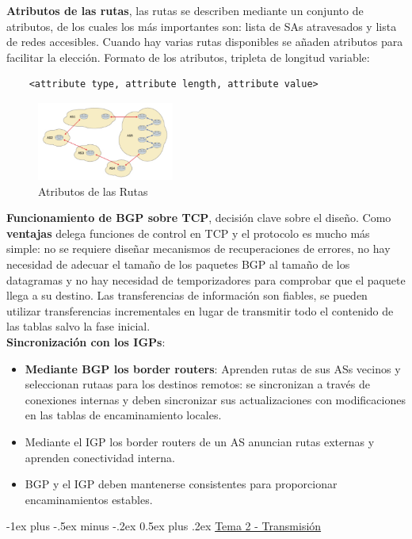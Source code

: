 \documentclass[10pt,portrait, twocolumn]{article}
\makeatletter
\renewcommand{\section}{\@startsection{section}{1}{0mm}%
                                {-1ex plus -.5ex minus -.2ex}%
                                {0.5ex plus .2ex}%
                                {\normalfont\large\bfseries}}
\makeatother
\begin{document}
\textbf{Atributos de las rutas}, las rutas se describen mediante un conjunto de atributos, de los cuales los más importantes son: lista de SAs atravesados y lista de redes accesibles. Cuando hay varias rutas disponibles se añaden atributos para facilitar la elección. Formato de los atributos, tripleta de longitud variable:

	\begin{verbatim}
	<attribute type, attribute length, attribute value>
	\end{verbatim}

\begin{figure}[h]
	\centering
     \includegraphics[width=0.4\textwidth]{Rutas}
      \caption{Atributos de las Rutas}
      \label{fig:Regiones de frecuencias}
  \end{figure}

\textbf{Funcionamiento de BGP sobre TCP}, decisión clave sobre el diseño. Como \textbf{ventajas} delega funciones de control en TCP y el protocolo es mucho más simple: no se requiere diseñar mecanismos de recuperaciones de errores, no hay necesidad de adecuar el tamaño de los paquetes BGP al tamaño de los datagramas y no hay necesidad de temporizadores para comprobar que el paquete llega a su destino. Las transferencias de información son fiables, se pueden utilizar transferencias incrementales en lugar de transmitir todo el contenido de las tablas salvo la fase inicial.\\

\textbf{Sincronización con los IGPs}:

	\begin{itemize}
		\item \textbf{Mediante BGP los border routers}: Aprenden rutas de sus ASs vecinos y seleccionan rutaas para los destinos remotos: se sincronizan a través de conexiones internas y deben sincronizar sus actualizaciones con modificaciones en las tablas de encaminamiento locales.
		\item Mediante el IGP los border routers de un AS anuncian rutas externas y aprenden conectividad interna.
		\item BGP y el IGP deben mantenerse consistentes para proporcionar encaminamientos estables.
	\end{itemize}
	
\hrulefill
	
\begin{center}
\section{\underline{Tema 2 - Transmisión}}
\end{center}

	
	




\end{document}
